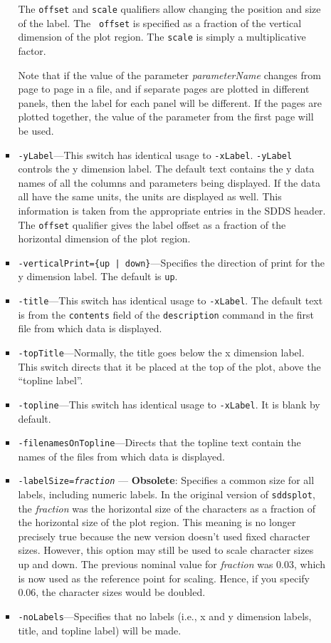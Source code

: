\begin{itemize}
\begin{itemize}
\begin{itemize}
The {\tt offset} and {\tt scale} qualifiers allow changing the position and size of the label.  The {\tt
offset} is specified as a fraction of the vertical dimension of the plot region.  The {\tt scale} is
simply a multiplicative factor.

Note that if the value of the parameter {\em parameterName} changes from page to page in a file, and if separate pages are
plotted in different panels, then the label for each panel will be different.  If the pages are plotted together, the value
of the parameter from the first page will be used.

  \item {\tt -yLabel}---This switch has identical usage to {\tt -xLabel}.  {\tt -yLabel} controls the y dimension label.  The
default text contains the y data names of all the columns and parameters being displayed.  If the data all have the same
units, the units are displayed as well.  This information is taken from the appropriate entries in the SDDS header.
The {\tt offset} qualifier gives the label offset as a fraction of the horizontal dimension of the plot region.

  \item {\tt -verticalPrint=\{up | down\}}---Specifies the direction of print for the y dimension label.
The default is {\tt up}.

  \item {\tt -title}---This switch has identical usage to {\tt -xLabel}.  The default text is from the {\tt contents}
field of the {\tt description} command in the first file from which data is displayed.  
  \item {\tt -topTitle}---Normally, the title goes below the x dimension label.  This switch directs that it be placed
at the top of the plot, above the ``topline label''.
  \item {\tt -topline}---This switch has identical usage to {\tt -xLabel}.  It is blank by default.
  \item {\tt -filenamesOnTopline}---Directs that the topline text contain the names of the files from which data
is displayed.
  \item {\tt -labelSize={\em fraction}} --- {\bf Obsolete}: 
Specifies a common size for all labels, including numeric labels.  
In the original version of {\tt sddsplot}, the {\em fraction} was the horizontal size of the characters as a 
fraction of the horizontal size of the plot region.  This meaning is no longer precisely true because the
new version doesn't used fixed character sizes.  However, this option may still be used to scale character
sizes up and down.  The previous nominal value for {\em fraction} was 0.03, which is now used as the reference
point for scaling.  Hence, if you specify 0.06, the character sizes would be doubled.  
  \item {\tt -noLabels}---Specifies that no labels (i.e., x and y dimension labels, title, and topline label) will be
made.  


\end{itemize}
\end{itemize}
\end{itemize}
